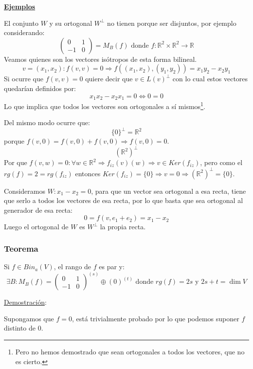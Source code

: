 \documentclass[10pt,a4paper,openright]{book}
\begin{document}
\underline{\textbf{Ejemplos}}

El conjunto $W$ y su ortogonal $W^\perp$ no tienen porque ser disjuntos, por ejemplo considerando:
$$\begin{pmatrix}
0 & 1\\ -1 & 0\end{pmatrix}=M_B(f)\mbox{ donde }f:\mathbb R^2\times \mathbb R^2\rightarrow \mathbb R$$
Veamos quienes son los vectores isótropos de esta forma bilineal.
$$v=(x_1,x_2): f(v,v)=0\Rightarrow f((x_1,x_2), (y_1,y_2))=x_1y_2- x_2y_1$$
Si ocurre que $f(v,v)=0$ quiere decir que $v\in L(v)^\perp$ con lo cual estos vectores quedarían definidos por:
$$x_1x_2-x_2x_1=0\Leftrightarrow 0=0$$
Lo que implica que todos los vectores son ortogonales a sí mismos\footnote{Pero no hemos demostrado que sean ortogonales a todos los vectores, que no es cierto.}.

Del mismo modo ocurre que:
$$\{0\}^\perp = \mathbb R^2$$
porque $f(v,0) = f(v,0)+f(v,0)\Rightarrow f(v,0)=0$.
$$(\mathbb R^2)^\perp$$
Por que $f(v,w)=0: \forall w \in \mathbb R^2\Rightarrow f_{iz}(v)(w)\Rightarrow v\in Ker(f_{iz})$, pero como el $rg(f)=2=rg(f_{iz})$ entonces $Ker(f_{iz})=\{0\}\Rightarrow v = 0\Rightarrow (\mathbb R^2)^\perp = \{0\}$.

Consideramos $W: x_1-x_2=0$, para que un vector sea ortogonal a esa recta, tiene que serlo a todos los vectores de esa recta, por lo que basta que sea ortogonal al generador de esa recta:
$$0=f(v,e_1+e_2)=x_1-x_2$$
Luego el ortogonal de $W$ es $W^\perp$ la propia recta.

\subsubsection*{Teorema}
Si $f\in Bin_a(V)$, el rango de $f$ es par y:
$$\exists B: M_B(f) = \begin{pmatrix} 0 & 1 \\ -1 & 0 \end{pmatrix}^{(s)}\oplus (0)^{(t)}\mbox{ donde }rg(f)=2s\mbox{ y }2s+t=\dim V$$

\underline{Demostración}:

Supongamos que $f=0$, está trivialmente probado por lo que podemos suponer $f$ distinto de 0.
\end{document}
